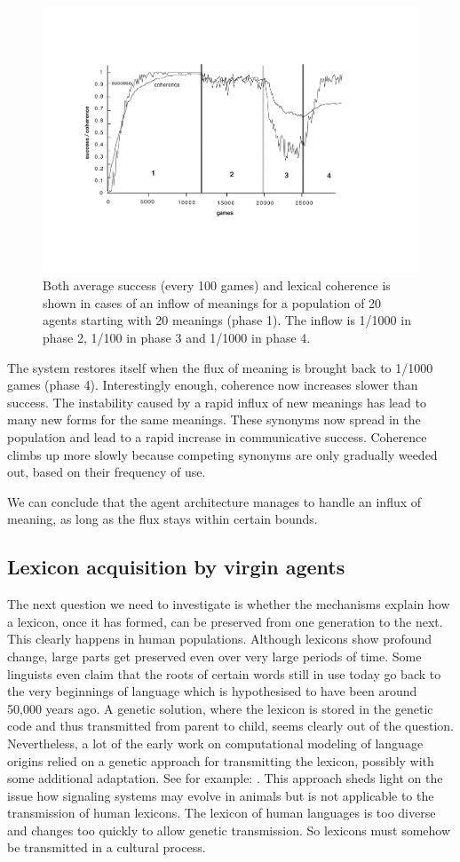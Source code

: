 \begin{figure}[htbp]
  \centerline{\includegraphics[width=.70\textwidth]{chap5/figs/in+out}}
\caption{ \label{inoutmean}  Both average success (every 100 games) and lexical coherence 
is shown in cases of an inflow of meanings for a population 
of 20 agents starting with 20 meanings (phase 1). The inflow 
is 1/1000 in phase 2, 1/100 in phase 3 and 1/1000 in phase 4.}
\end{figure}

The system restores itself
when the flux of meaning is brought back to 1/1000 games
(phase 4). Interestingly enough, coherence now increases slower
than success. 
The instability caused by a rapid influx of new meanings has lead 
to many new forms for the same meanings. These synonyms
now spread in the population and lead to a rapid
increase in communicative success. Coherence
climbs up more slowly because competing synonyms 
are only gradually weeded out, based on their frequency of use. 

We can conclude that the agent architecture
manages to handle an influx of meaning, as long as the flux 
stays within certain bounds. 

\subsection{Lexicon acquisition by virgin agents}

The next question we need to investigate
is whether the mechanisms 
explain how a lexicon, once it has formed, can 
be preserved from one generation to the next. This clearly 
happens in human populations. Although lexicons show
profound change, large parts get preserved even over 
very large periods of time. 
Some linguists even claim that the roots of certain 
words still in use today go back to the very beginnings
of language which is hypothesised to 
have been around 50,000 
years ago.\cite{Ruhlen:1994}
A genetic solution, where the lexicon is stored in the genetic 
code and thus transmitted from parent to child, seems clearly 
out of the question. Nevertheless, a lot of the 
early work on computational modeling
of language origins relied on a genetic approach 
for transmitting the lexicon, possibly with some
additional adaptation. See for example: \cite[603--631]{MacLennan:1991}.
This approach sheds light on the issue how signaling
systems may evolve in animals but is not applicable
to the transmission of human lexicons. The lexicon of human languages 
is too diverse and changes too quickly to allow genetic
transmission. So lexicons must somehow be transmitted 
in a cultural process.


